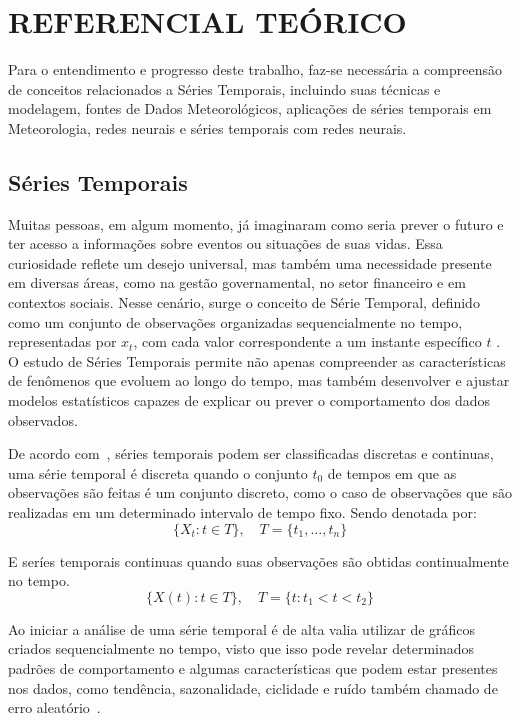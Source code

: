 \chapter{REFERENCIAL TEÓRICO}
Para o entendimento e progresso deste trabalho, faz-se necessária a compreensão de conceitos relacionados a 
Séries Temporais, incluindo suas técnicas e modelagem, fontes de Dados Meteorológicos, 
aplicações de séries temporais em Meteorologia, redes neurais e séries temporais com redes neurais. 

\section{Séries Temporais}
    Muitas pessoas, em algum momento, já imaginaram como seria prever o futuro e ter acesso a informações sobre eventos 
    ou situações de suas vidas. Essa curiosidade reflete um desejo universal, mas também uma necessidade presente em 
    diversas áreas, como na gestão governamental, no setor financeiro e em contextos sociais. Nesse cenário, surge o 
    conceito de Série Temporal, definido como um conjunto de observações organizadas sequencialmente no tempo, 
    representadas por \( x_t \), com cada valor correspondente a um instante específico \(t\) \cite{box2015}. O estudo de 
    Séries Temporais permite não apenas compreender as características de fenômenos que evoluem ao longo do tempo, mas 
    também desenvolver e ajustar modelos estatísticos capazes de explicar ou prever o comportamento dos dados 
    observados.
    
    De acordo com~\cite{brockwell2002}, séries temporais podem ser classificadas 
    discretas e continuas, uma série temporal é discreta quando o conjunto \( t_0 \) de tempos em que as observações 
    são feitas é um conjunto discreto, como o caso de observações que são realizadas em um determinado intervalo de 
    tempo fixo. Sendo denotada por:
    \begin{equation}
        \{X_t : t \in T\}, \quad T = \{t_1, \dots, t_n\}
    \end{equation}
    
    
    
    E seríes temporais continuas quando suas observações são obtidas continualmente 
    no tempo. 
    \begin{equation}
        \{X(t) : t \in T\}, \quad T = \{t : t_1 < t < t_2\}
    \end{equation}
        

    
    Ao iniciar a análise de uma série temporal é de alta valia utilizar de gráficos criados sequencialmente no tempo,
    visto que isso pode revelar determinados padrões de comportamento e algumas características que podem estar 
    presentes nos dados, como tendência, sazonalidade, ciclidade e ruído também chamado de erro aleatório~\cite{costa2019}. 

